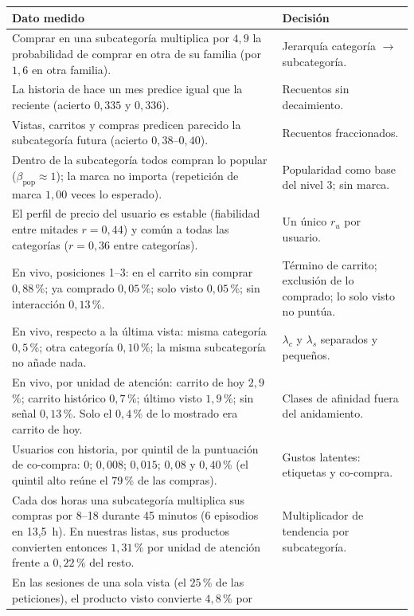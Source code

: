 \documentclass[11pt,a4paper]{article}
\begin{document}
\begin{center}
\begin{tabular}{p{7.4cm}p{7.4cm}}
\toprule
Dato medido & Decisión\\
\midrule
Comprar en una subcategoría multiplica por $4{,}9$ la probabilidad de comprar en otra de su familia
(por $1{,}6$ en otra familia). & Jerarquía categoría $\to$ subcategoría.\\
La historia de hace un mes predice igual que la reciente (acierto $0{,}335$ y $0{,}336$). & Recuentos sin
decaimiento.\\
Vistas, carritos y compras predicen parecido la subcategoría futura (acierto $0{,}38$--$0{,}40$). & Recuentos
fraccionados.\\
Dentro de la subcategoría todos compran lo popular ($\beta_{\text{pop}}\approx 1$); la marca no importa
(repetición de marca $1{,}00$ veces lo esperado). & Popularidad como base del nivel 3; sin marca.\\
El perfil de precio del usuario es estable (fiabilidad entre mitades $r=0{,}44$) y común a todas las
categorías ($r=0{,}36$ entre categorías). & Un único $r_u$ por usuario.\\
En vivo, posiciones 1--3: en el carrito sin comprar $0{,}88$\,\%; ya comprado $0{,}05$\,\%; solo visto
$0{,}05$\,\%; sin interacción $0{,}13$\,\%. & Término de carrito; exclusión de lo comprado; lo solo visto no
puntúa.\\
En vivo, respecto a la última vista: misma categoría $0{,}5$\,\%; otra categoría $0{,}10$\,\%; la misma
subcategoría no añade nada. & $\lambda_c$ y $\lambda_s$ separados y pequeños.\\
En vivo, por unidad de atención: carrito de hoy $2{,}9$\,\%; carrito histórico $0{,}7$\,\%; último visto
$1{,}9$\,\%; sin señal $0{,}13$\,\%. Solo el $0{,}4$\,\% de lo mostrado era carrito de hoy. & Clases de
afinidad fuera del anidamiento.\\
Usuarios con historia, por quintil de la puntuación de co-compra: $0$; $0{,}008$; $0{,}015$; $0{,}08$ y
$0{,}40$\,\% (el quintil alto reúne el $79$\,\% de las compras). & Gustos latentes: etiquetas y co-compra.\\
Cada dos horas una subcategoría multiplica sus compras por 8--18 durante 45 minutos (6 episodios en 13{,}5~h).
En nuestras listas, sus productos convierten entonces $1{,}31$\,\% por unidad de atención frente a
$0{,}22$\,\% del resto. & Multiplicador de tendencia por subcategoría.\\
En las sesiones de una sola vista (el $25$\,\% de las peticiones), el producto visto convierte $4{,}8$\,\% por

\end{tabular}
\end{center}
\end{document}
